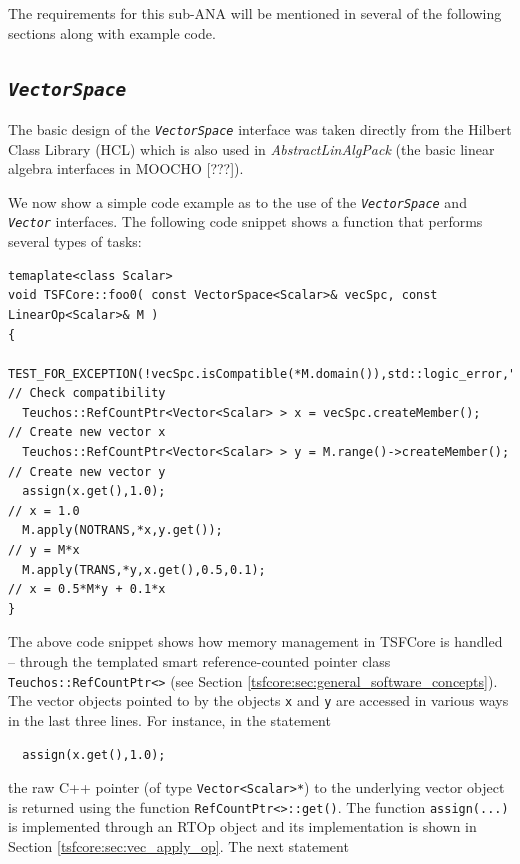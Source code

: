 The requirements for this sub-ANA will be mentioned in several of the
following sections along with example code.

%
\subsection{\texttt{\textit{VectorSpace}}}
\label{tsfcore:sec:vec_space}
%

The basic design of the {}\texttt{\textit{VectorSpace}} interface was
taken directly from the Hilbert Class Library (HCL) {}\cite{ref:hcl}
which is also used in {}\textit{AbstractLinAlgPack} (the basic linear
algebra interfaces in MOOCHO [???]).

We now show a simple code example as to the use of the
{}\texttt{\textit{VectorSpace}} and {}\texttt{\textit{Vector}}
interfaces.  The following code snippet shows a function that performs
several types of tasks:

{\scriptsize\begin{verbatim}
temaplate<class Scalar>
void TSFCore::foo0( const VectorSpace<Scalar>& vecSpc, const LinearOp<Scalar>& M )
{
  TEST_FOR_EXCEPTION(!vecSpc.isCompatible(*M.domain()),std::logic_error,"Error!"); // Check compatibility
  Teuchos::RefCountPtr<Vector<Scalar> > x = vecSpc.createMember();                 // Create new vector x
  Teuchos::RefCountPtr<Vector<Scalar> > y = M.range()->createMember();             // Create new vector y
  assign(x.get(),1.0);                                                             // x = 1.0
  M.apply(NOTRANS,*x,y.get());                                                     // y = M*x
  M.apply(TRANS,*y,x.get(),0.5,0.1);                                               // x = 0.5*M*y + 0.1*x
}
\end{verbatim}}

{}\noindent{}The above code snippet shows how memory management in
TSFCore is handled -- through the templated smart reference-counted
pointer class {}\texttt{Teuchos\-::RefCountPtr<>} (see Section
{}\ref{tsfcore:sec:general_software_concepts}).  The vector objects
pointed to by the objects {}\texttt{x} and {}\texttt{y} are accessed
in various ways in the last three lines.  For instance, in the
statement

{\scriptsize\begin{verbatim}
  assign(x.get(),1.0);
\end{verbatim}}

{}\noindent{}the raw C++ pointer (of type {}\texttt{Vector<Scalar>*})
to the underlying vector object is returned using the function
{}\texttt{RefCountPtr<>\-::get()}.  The function
{}\texttt{assign(...)} is implemented through an RTOp object and its
implementation is shown in Section {}\ref{tsfcore:sec:vec_apply_op}.
The next statement

